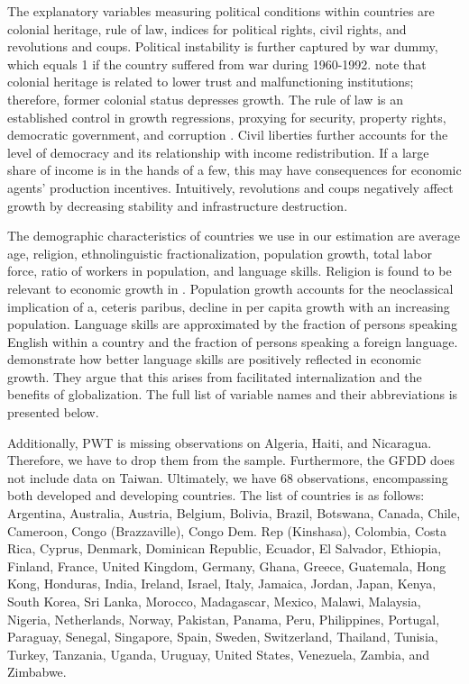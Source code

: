 \begin{refsection}
\begin{subappendices}
The explanatory variables measuring political conditions within countries are colonial heritage, rule of law, indices for political rights, civil rights, and revolutions and coups. Political instability is further captured by war dummy, which equals 1 if the country suffered from war during 1960-1992. \textcite{Acemogluetal2001} note that colonial heritage is related to lower trust and malfunctioning institutions; therefore, former colonial status depresses growth. The rule of law is an established control in growth regressions, proxying for security, property rights, democratic government, and corruption \parencite{HaggardTiede2011}. Civil liberties further accounts for the level of democracy and its relationship with income redistribution. If a large share of income is in the hands of a few, this may have consequences for economic agents' production incentives. Intuitively, revolutions and coups negatively affect growth by decreasing stability and infrastructure destruction.

The demographic characteristics of countries we use in our estimation are average age, religion, ethnolinguistic fractionalization, population growth, total labor force, ratio of workers in population, and language skills. Religion is found to be relevant to economic growth in \textcite{Barro1996}. Population growth accounts for the neoclassical implication of a, ceteris paribus, decline in per capita growth with an increasing population. Language skills are approximated by the fraction of persons speaking English within a country and the fraction of persons speaking a foreign language. \textcite{HallJones1996} demonstrate how better language skills are positively reflected in economic growth. They argue that this arises from facilitated internalization and the benefits of globalization. The full list of variable names and their abbreviations is presented below.

Additionally, \ac{PWT} is missing observations on Algeria, Haiti, and Nicaragua. Therefore, we have to drop them from the sample. Furthermore, the GFDD does not include data on Taiwan. Ultimately, we have 68 observations, encompassing both developed and developing countries. The list of countries is as follows: Argentina, Australia, Austria, Belgium, Bolivia, Brazil, Botswana, Canada, Chile, Cameroon, Congo (Brazzaville), Congo Dem. Rep (Kinshasa), Colombia, Costa Rica, Cyprus, Denmark, Dominican Republic, Ecuador, El Salvador, Ethiopia, Finland, France, United Kingdom, Germany, Ghana, Greece, Guatemala, Hong Kong, Honduras, India, Ireland, Israel, Italy, Jamaica, Jordan, Japan, Kenya, South Korea, Sri Lanka, Morocco, Madagascar, Mexico, Malawi, Malaysia, Nigeria, Netherlands, Norway, Pakistan, Panama, Peru, Philippines, Portugal, Paraguay, Senegal, Singapore, Spain, Sweden, Switzerland, Thailand, Tunisia, Turkey, Tanzania, Uganda, Uruguay, United States, Venezuela, Zambia, and Zimbabwe.


\end{subappendices}
\end{refsection}
